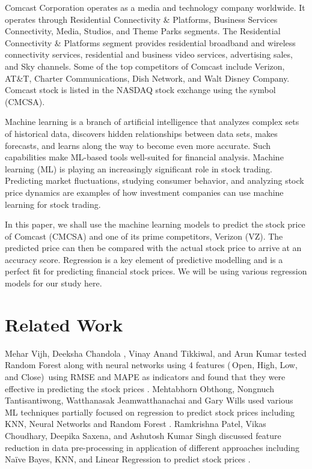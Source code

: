 \documentclass[conference]{IEEEtran}
\begin{document}
Comcast Corporation operates as a media and technology company worldwide.
It operates through Residential Connectivity \& Platforms, Business Services Connectivity, Media, Studios, and Theme Parks segments.
The Residential Connectivity \& Platforms segment provides residential broadband and wireless connectivity services, residential and business video services, advertising sales, and Sky channels. Some of the top competitors of Comcast include Verizon, AT\&T, Charter Communications, Dish Network, and Walt Disney Company.
Comcast stock is listed in the NASDAQ stock exchange using the symbol (CMCSA).\par
Machine learning is a branch of artificial intelligence that analyzes complex sets of historical data, discovers hidden relationships between data sets, makes forecasts, and learns along the way to become even more accurate.
Such capabilities make ML-based tools well-suited for financial analysis.
Machine learning (ML) is playing an increasingly significant role in stock trading.
Predicting market fluctuations, studying consumer behavior, and analyzing stock price dynamics are examples of how investment companies can use machine learning for stock trading.\par
In this paper, we shall use the machine learning models to predict the stock price of Comcast (CMCSA) and one of its prime competitors, Verizon (VZ).
The predicted price can then be compared with the actual stock price to arrive at an accuracy score. Regression is a key element of predictive modelling and is a perfect fit for predicting financial stock prices.
We will be using various regression models for our study here.

\section{Related Work}

Mehar Vijh, Deeksha Chandola , Vinay Anand Tikkiwal, and Arun Kumar tested Random Forest along with neural networks using 4 features (\,Open, High, Low, and Close)\, using RMSE and MAPE as indicators and found that they were effective in predicting the stock prices \cite{b3}.
Mehtabhorn Obthong, Nongnuch Tantisantiwong, Watthanasak Jeamwatthanachai and Gary Wills used various ML techniques partially focused on regression to predict stock prices including KNN, Neural Networks and Random Forest \cite{b4}.
Ramkrishna Patel, Vikas Choudhary, Deepika Saxena, and Ashutosh Kumar Singh discussed feature reduction in data pre-processing in application of different approaches including Naïve Bayes, KNN, and Linear Regression to predict stock prices \cite{b5}.
\end{document}
